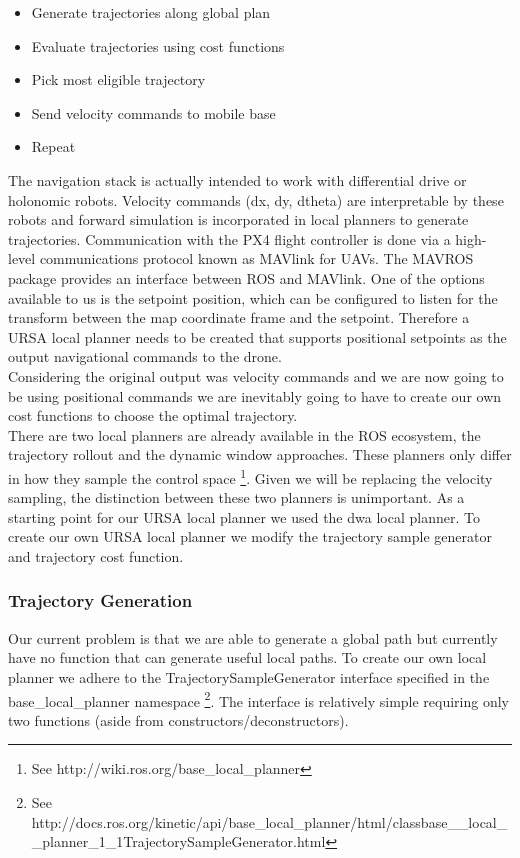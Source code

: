 \documentclass[capstone_report.tex]{subfiles}
\begin{document}
\begin{itemize}
    \item Generate trajectories along global plan
    \item Evaluate trajectories using cost functions
    \item Pick most eligible trajectory
    \item Send velocity commands to mobile base
    \item Repeat
\end{itemize}

The navigation stack is actually intended to work with differential drive or holonomic robots.  Velocity commands (dx, dy, dtheta) are interpretable by these robots and forward simulation is incorporated in local planners to generate trajectories.  Communication with the PX4 flight controller is done via a high-level communications protocol known as MAVlink for UAVs.  The MAVROS package provides an interface between ROS and MAVlink.  One of the options available to us is the setpoint position, which can be configured to listen for the transform between the map coordinate frame and the setpoint.  Therefore a URSA local planner needs to be created that supports positional setpoints as the output navigational commands to the drone.\\

Considering the original output was velocity commands and we are now going to be using positional commands we are inevitably going to have to create our own cost functions to choose the optimal trajectory.\\

There are two local planners are already available in the ROS ecosystem, the trajectory rollout and the dynamic window approaches.  These planners only differ in how they sample the control space \footnote{See http://wiki.ros.org/base\_local\_planner}.  Given we will be replacing the velocity sampling, the distinction between these two planners is unimportant.  As a starting point for our URSA local planner we used the dwa local planner.  To create our own URSA local planner we modify the trajectory sample generator and trajectory cost function.

\subsubsection{Trajectory Generation} \label{sec: traj_gen}

Our current problem is that we are able to generate a global path but currently have no function that can generate useful local paths.  To create our own local planner we adhere to the TrajectorySampleGenerator interface specified in the base\_local\_planner namespace \footnote{See http://docs.ros.org/kinetic/api/base\_local\_planner/html/classbase\_\_local\_\_planner\_1\_1TrajectorySampleGenerator.html}.   The interface is relatively simple requiring only two functions (aside from constructors/deconstructors).
\end{document}
